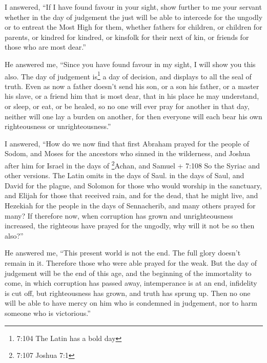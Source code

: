  I answered, ``If I have found favour in your sight, show
further to me your servant whether in the day of judgement the just will
be able to intercede for the ungodly or to entreat the Most High for
them,  whether fathers for children, or children for
parents, or kindred for kindred, or kinsfolk for their next of kin, or
friends for those who are most dear.''

 He answered me, ``Since you have found favour in my
sight, I will show you this also. The day of judgement is\footnote{7:104
  The Latin has a bold day} a day of decision, and displays to all the
seal of truth. Even as now a father doesn't send his son, or a son his
father, or a master his slave, or a friend him that is most dear, that
in his place he may understand, or sleep, or eat, or be healed,
 so no one will ever pray for another in that day, neither
will one lay a burden on another, for then everyone will each bear his
own righteousness or unrighteousness.''

 I answered, ``How do we now find that first Abraham
prayed for the people of Sodom, and Moses for the ancestors who sinned
in the wilderness,  and Joshua after him for Israel in the
days of \footnote{7:107 Joshua 7:1}Achan,  and Samuel +
7:108 So the Syriac and other versions. The Latin omits in the days of
Saul. in the days of Saul, and David for the plague, and Solomon for
those who would worship in the sanctuary,  and Elijah for
those that received rain, and for the dead, that he might live,
 and Hezekiah for the people in the days of Sennacherib,
and many others prayed for many?  If therefore now, when
corruption has grown and unrighteousness increased, the righteous have
prayed for the ungodly, why will it not be so then also?''

 He answered me, ``This present world is not the end. The
full glory doesn't remain in it. Therefore those who were able prayed
for the weak.  But the day of judgement will be the end of
this age, and the beginning of the immortality to come, in which
corruption has passed away,  intemperance is at an end,
infidelity is cut off, but righteousness has grown, and truth has sprung
up.  Then no one will be able to have mercy on him who is
condemned in judgement, nor to harm someone who is victorious.''

